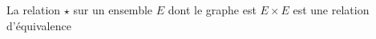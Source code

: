 La relation $\star$ sur un ensemble $E$ dont le graphe est $E\times E$ est une relation d'équivalence

\begin{reponses}
\end{reponses}

